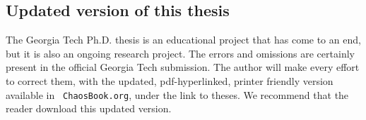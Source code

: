 \subsection{Updated version of this thesis}

The Georgia Tech Ph.D. thesis is an educational project that
has come to an end, but it is also an ongoing research
project. The errors and omissions are certainly present in
the official Georgia Tech submission. The author will make
every effort to correct them, with the updated,
pdf-hyperlinked, printer friendly version available in {\tt
ChaosBook.org}, under the link to theses. We recommend
that the reader download this updated version.
